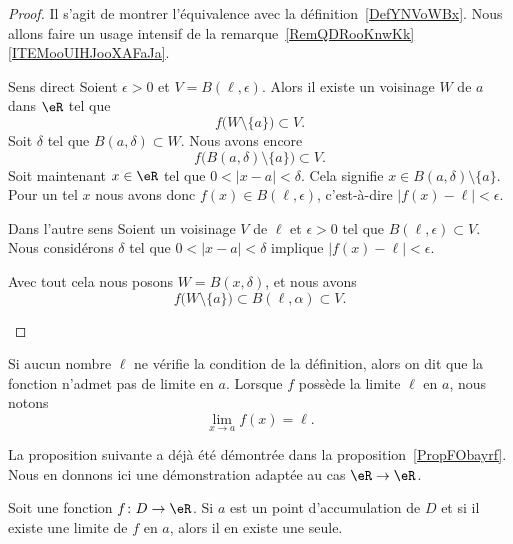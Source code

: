 \begin{proof}
    Il s'agit de montrer l'équivalence avec la définition~\ref{DefYNVoWBx}. Nous allons faire un usage intensif de la remarque~\ref{RemQDRooKnwKk}\ref{ITEMooUIHJooXAFaJa}.
    \begin{subproof}
    \item[Sens direct]
        Soient \( \epsilon>0\) et \( V=B(\ell,\epsilon)\). Alors il existe un voisinage \( W\) de \( a\) dans \( \eR\) tel que
        \begin{equation}
            f\big( W\setminus\{ a \} \big)\subset V.
        \end{equation}
        Soit \( \delta\) tel que \( B(a,\delta)\subset W\). Nous avons encore
        \begin{equation}
            f\big( B(a,\delta)\setminus\{ a \} \big)\subset V.
        \end{equation}
        Soit maintenant \( x\in \eR\) tel que $0<| x-a |<\delta$. Cela signifie \( x\in B(a,\delta)\setminus\{ a \}\). Pour un tel \( x\) nous avons donc \( f(x)\in B(\ell,\epsilon)\), c'est-à-dire \( | f(x)-\ell |<\epsilon\).
    \item[Dans l'autre sens]
        Soient un voisinage \( V\) de \( \ell\) et \( \epsilon>0\) tel que \( B(\ell,\epsilon)\subset V\). Nous considérons \( \delta\) tel que \( 0<| x-a |<\delta\) implique \( | f(x)-\ell |<\epsilon\).

        Avec tout cela nous posons \( W=B(x,\delta)\), et nous avons
        \begin{equation}
            f\big( W\setminus\{ a \} \big)\subset B(\ell,\alpha)\subset V.
        \end{equation}
    \end{subproof}
\end{proof}

Si aucun nombre $\ell$ ne vérifie la condition de la définition, alors on dit que la fonction n'admet pas de limite en $a$. Lorsque $f$ possède la limite $\ell$ en $a$, nous notons
\begin{equation}
	\lim_{x\to a} f(x)=\ell.
\end{equation}

La proposition suivante a déjà été démontrée dans la proposition~\ref{PropFObayrf}. Nous en donnons ici une démonstration adaptée au cas \( \eR\to \eR\).

\begin{proposition}
	Soit une fonction $f\colon D\to \eR$. Si $a$ est un point d'accumulation de $D$ et si il existe une limite de $f$ en $a$, alors il en existe une seule.
\end{proposition}


